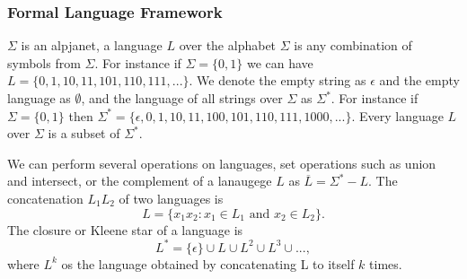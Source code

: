 \subsubsection{Formal Language Framework}
$\Sigma$ is an alpjanet, a language $L$ over the alphabet $\Sigma$ is any
combination of symbols from $\Sigma$.  For instance if $\Sigma = \{0,1\}$ we can
have $L = \{0,1,10,11,101,110,111 , ...\}$. We denote the empty string as
$\epsilon$ and the empty language as $\emptyset$, and the language of all
strings over $\Sigma$ as $\Sigma^*$.  For instance if $\Sigma = \{0,1\}$ then
$\Sigma^* = \{\epsilon,0,1,10,11,100,101,110,111,1000,...\}$. Every language
$L$over $\Sigma$ is a subset of $\Sigma^*$.

We can perform several operations on languages, set operations such as union and
intersect, or the complement of a lanaugege $L$ as $\overline{L} = \Sigma^* -
L$. The concatenation $L_1L_2$ of two languages is
\[
  L = \{x_1x_2 : x_1 \in L_1 \text{ and } x_2 \in L_2\}.
\]
The closure or Kleene star of a language is
\[
  L^* = \{\epsilon\}\cup L\cup L^2 \cup L^3 \cup ... ,
\]
where $L^k$ os the language obtained by concatenating L to itself $k$ times.





